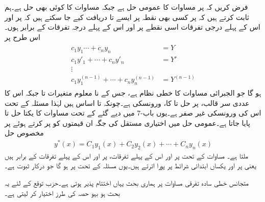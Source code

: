 
فرض کریں کہ  پر مساوات  کا عمومی حل  ہے جبکہ  مساوات  کا کوئی بھی حل ہے۔ہم ثابت کرتے ہیں کہ  پر کسی بھی نقطہ  پر ایسے  تا  دریافت کیے جا سکتے ہیں کہ  پر  اور اس کے پہلے  درجی تفرقات اسی نقطے پر  اور اس کے پہلے  درجہ تفرقات کے برابر ہوں۔ اس طرح  پر 
\begin{gather}
\begin{aligned}\label{مساوات_سادہ_بلند_ورونسکی_سے_مستقل}
c_1y_1\cdots+c_ny_n&=Y\\
c_1y'_1+\cdots+c_ny'_n&=Y'\\
\vdots &\\
c_1y^{(n-1)}_1+\cdots+c_ny^{(n-1)}_n&=Y^{(n-1)}
\end{aligned}
\end{gather}
ہو گا جو الجبرائی مساوات کا خطی نظام ہے، جس کے نا معلوم متغیرات  تا  جبکہ اس کا عددی سر قالب،  پر حل  تا  کا،  ورونسکی ہے۔چونکہ  تا  اساس ہیں لہٰذا مسئلہ  کے تحت اس کی ورونسکی غیر صفر ہے۔یوں باب-7 میں دیے گئے  کے تحت مساوات  کا یکتا حل 
  تا   پایا جاتا ہے۔عمومی حل میں اختیاری مستقل کی جگہ ان قیمتوں کو پر کرتے ہوئے  پر مخصوص حل
\begin{align*}
y^*(x)=C_1y_1(x)+C_2y_2(x)+\cdots+C_ny_n(x)
\end{align*}
ملتا ہے۔ مساوات  کے تحت  پر  اور اس کے پہلے  تفرقات،  پر  اور اس کے پہلے  تفرقات کے برابر ہیں یعنی  پر  اور  یکساں ابتدائی شرائط پر پورا اترتے ہیں۔یوں مسئلہ  کے تحت  پر  ہو گا جو درکار ثبوت ہے۔

متجانس خطی سادہ تفرقی مساوات پر ہماری بحث یہاں اختتام پذیر ہوتی ہے۔حزب توقع  کے لئے یہ بحث ہو بہو حصہ  کی طرز اختیار کر لیتی ہے۔


